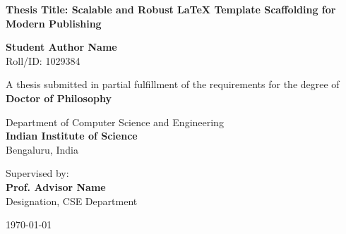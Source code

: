 \begin{titlepage}
\begin{center}
    \vspace*{1cm}
    
    
    \vspace{1.5cm}
    
    {\huge \bfseries \color{primary} Thesis Title: Scalable and Robust LaTeX Template Scaffolding for Modern Publishing}
    
    \vspace{1.5cm}
    
    {\Large \bfseries Student Author Name} \\
    \vspace{0.2cm}
    {Roll/ID: 1029384}
    
    \vspace{1.5cm}
    
    {A thesis submitted in partial fulfillment of the requirements for the degree of} \\
    \vspace{0.3cm}
    {\large \bfseries \color{secondary} Doctor of Philosophy}
    
    \vspace{1.5cm}
    
    {\large Department of Computer Science and Engineering} \\
    \vspace{0.2cm}
    {\large \bfseries \color{primary} Indian Institute of Science} \\
    \vspace{0.1cm}
    {Bengaluru, India}
    
    \vfill
    
    {Supervised by:} \\
    {\large \bfseries Prof. Advisor Name} \\
    {Designation, CSE Department}
    
    \vspace{1cm}
    
    {\large \today}
    
\end{center}
\end{titlepage}

